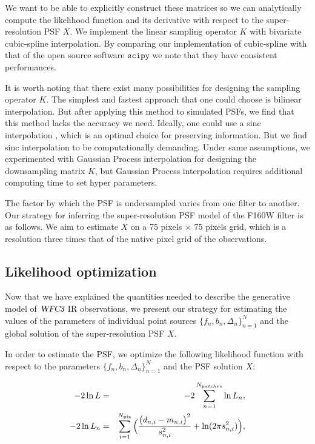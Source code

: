 We want to be able to explicitly construct these matrices so we can analytically compute the likelihood function and its derivative with respect to the super-resolution PSF $X$. 
We implement the linear sampling operator $K$ with bivariate cubic-spline interpolation. By comparing our implementation of cubic-spline with that of the open source 
software $\mathtt{scipy}$ we note that they have consistent performances.

It is worth noting that there exist many possibilities for designing the sampling operator $K$.  The simplest and fastest approach that one could 
choose is bilinear interpolation. But after applying this method to simulated PSFs, we find that this method lacks the accuracy we 
need. Ideally, one could use a sinc interpolation \citep{bickerton,galsim}, which is an optimal choice for preserving information.
But we find sinc interpolation to be computationally demanding. Under same assumptions, we experimented with Gaussian Process interpolation for designing the downsampling matrix $K$, but Gaussian Process interpolation requires additional computing time to set hyper parameters.


The factor by which the PSF is undersampled varies from one filter to another. Our strategy for inferring the super-resolution PSF model of the F160W filter is as follows. 
We aim to estimate $X$ on a 75 pixels $\times$ 75 pixels grid, which is a resolution three times that of the native pixel grid of the observations.

\subsection{Likelihood optimization}

Now that we have explained the quantities needed to describe the generative model of ${\textsl{WFC3}}$ IR observations, we 
present our strategy for estimating the values of the parameters of individual point sources $\{f_{n},b_{n},\Delta_{n}\}_{n=1}^{N}$ and 
the global solution of the super-resolution PSF $X$.


In order to estimate the PSF, we optimize the following likelihood function with respect to the parameters $\{f_{n},b_{n},\Delta_{n}\}_{n=1}^{N}$ and the PSF solution $X$:

\begin{eqnarray} -2 \ln L &=& -2 \sum_{n=1}^{N_{patches}} \ln L_{n} \label{eq:total} , \\
-2 \ln L_{n} &=& \sum_{i=1}^{N_{\rm pix}} \Big( \frac{\big(d_{n,i} - m_{n,i} \big)^{2}}{s^{2}_{n,i}} + \ln(2 \pi s_{n,i}^{2}) \Big) \label{eq:patch},
\end{eqnarray}


